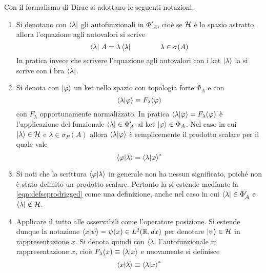 \documentclass[../../FisicaTeorica.tex]{subfiles}
\begin{document}
Con il formalismo di Dirac si adottano le seguenti notazioni.
\begin{enumerate}
\item Si denotano con $\bra\lambda$ gli autofunzionali in $\Phi'_A$, cioè se $\mathcal{H}$ è lo spazio astratto, allora l'equazione agli autovalori si scrive
\[
\bra\lambda \, A = \lambda \bra\lambda \qquad \qquad \lambda \in \sigma(A)
\]
In pratica invece che scrivere l'equazione agli autovalori con i ket $\ket\lambda$ la si scrive con i bra $\bra\lambda$.
\item Si denota con $\ket\varphi$ un ket nello spazio con topologia forte $\Phi_A$ e con
\[
\braket{\lambda | \varphi} \equiv F_\lambda (\varphi)
\]
con $F_\lambda$ opportunamente normalizzato. In pratica $\braket{\lambda | \varphi} = F_\lambda(\varphi)$ è l'applicazione del funzionale $\bra\lambda \in \Phi_A'$ al ket $\ket\varphi \in \Phi_A$.
Nel caso in cui $\ket\lambda \in \mathcal{H}$ e $\lambda \in \sigma_P(A)$ allora $\braket{\lambda|\varphi}$ è semplicemente il prodotto scalare per il quale vale
\begin{equation}
\label{eqn:defscprodrigged}
\braket{\varphi | \lambda} = \braket{\lambda | \varphi}^*
\end{equation}
\item Si noti che la scrittura $\braket{\varphi | \lambda}$ in generale non ha nessun significato, poiché non è stato definito un prodotto scalare. Pertanto la si estende mediante la \eqref{eqn:defscprodrigged} come una definizione, anche nel caso in cui $\bra\lambda \in \Phi'_A$ e $\bra\lambda \notin \mathcal{H}$.
\item Applicare il tutto alle osservabili come l'operatore posizione. Si estende dunque la notazione $\braket{x | \psi} = \psi(x) \in L^2(\mathbb R, d x)$ per denotare $\ket\psi \in \mathcal{H}$ in rappresentazione $x$. Si denota quindi con $\bra{\lambda}$ l'autofunzionale in rappresentazione $x$, cioè $F_\lambda(x) \equiv \braket{\lambda | x}$ e nuovamente si definisce 
\[
\braket{x | \lambda} \equiv \braket{\lambda | x}^*
\]
\end{enumerate}
\end{document}

